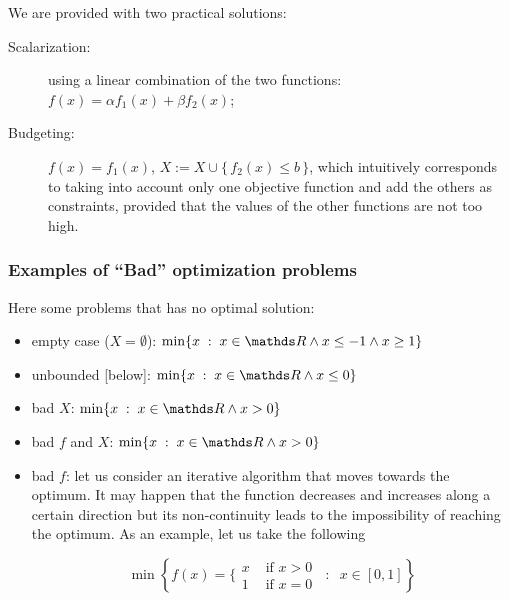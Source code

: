 \documentclass[computationalMathematics.tex]{subfiles}
\begin{document}
\newpage
We are provided with two practical solutions:

\begin{description}
  \item[{\sc Scalarization:}] using a linear combination of the two functions: $f(x) = \alpha f_1(x) + \beta f_2(x)$;
  \item[{\sc Budgeting:}] $f(x) = f_1(x)$, $X := X \cup \{ \, f_2(x) \leq b \, \}$, which intuitively corresponds to taking into account only one objective function and add the others as constraints, provided that the values of the other functions are not too high.
\end{description}

\subsubsection{Examples of “Bad” optimization problems}
Here some problems that has no optimal solution:
\begin{itemize}
    \item empty case ($X = \emptyset$): $\min\{ x \; : \; x \in \R \land x \leq -1 \land x \geq 1\}$
    \item unbounded [below]:  $\min\{ x \; : \; x \in \R \land x \leq 0\}$
    \item bad $X$:  $\min\{ x \; : \; x \in \R \land x > 0\}$
    \item bad $f$ and  $X$:  $\min\{ x \; : \; x \in \R \land x > 0\}$
    \item bad $f$: let us consider an iterative algorithm that moves towards the optimum.
It may happen that the function decreases and increases along a certain direction but its non-continuity leads to the impossibility of reaching the optimum.
As an example, let us take the following

\[
  \min \left\{f(x) =\bigg\{\begin{array}{ll} x & \mbox{ if } x > 0 \\
        1 & \mbox{ if } x = 0
        \end{array} \; \; : \; \; x \in [0, 1]\right\}
\]
\end{itemize}
\newpage
\end{document}
